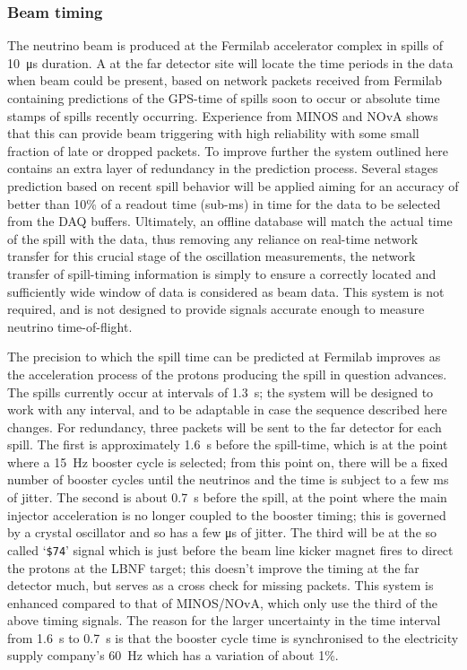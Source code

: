 

\subsubsection{Beam timing}
\label{sec:fd-daq-design-beamtiming}

The neutrino beam is produced at the Fermilab accelerator complex in
spills of \SI{10}{\us} duration. 
A  at the far detector site will locate the time periods in
the data when beam could be present, based on network packets received
from Fermilab containing predictions of the GPS-time of spills soon to
occur or absolute time stamps of spills recently occurring. 
Experience from MINOS and NOvA shows that this can provide beam
triggering with high reliability with some small fraction of late or
dropped packets.
To improve further the system outlined here contains an extra layer
of redundancy in the prediction process. 
Several stages prediction based on recent spill behavior will be applied aiming
for an accuracy of better than 10\% of a readout
time (sub-\si{\ms}) in time for the data to be selected from
the DAQ buffers. 
Ultimately, an offline database will match the actual time of the
spill with the data, thus removing any reliance on real-time network
transfer for this crucial stage of the oscillation measurements, the
network transfer of spill-timing information is simply to ensure a
correctly located and sufficiently wide window of data is considered
as beam data. This system is not required, and is not designed to
provide signals accurate enough to measure neutrino time-of-flight.

The precision to which the spill time can be predicted at Fermilab
improves as the acceleration process of the protons producing the
spill in question advances.  The spills currently occur at intervals
of \SI{1.3}{\s}; the system will be designed to work with any interval, and
to be adaptable in case the sequence described here changes.  For
redundancy, three packets will be sent to the far detector for each
spill.  The first is approximately \SI{1.6}{\s} before the spill-time, which
is at the point where a \SI{15}{\Hz} booster cycle is selected; from this
point on, there will be a fixed number of booster cycles until the
neutrinos and the time is subject to a few ms of jitter.  The second
is about \SI{0.7}{\s} before the spill, at the point where the main injector
acceleration is no longer coupled to the booster timing; this is
governed by a crystal oscillator and so has a few \si{\us} of jitter.
The third will be at the so called `\texttt{\$74}' signal which is just before the beam line kicker magnet fires
to direct the protons at the LBNF target; this doesn't improve the
timing at the far detector much, but serves as a cross check for
missing packets.  This system is enhanced compared to that of
MINOS/NOvA, which only use the third of the above timing signals.  The
reason for the larger uncertainty in the time interval from \SI{1.6}{\s} to
\SI{0.7}{\s} is that the booster cycle time is synchronised to the
electricity supply company's \SI{60}{\Hz} which has a variation of about
1\%.

